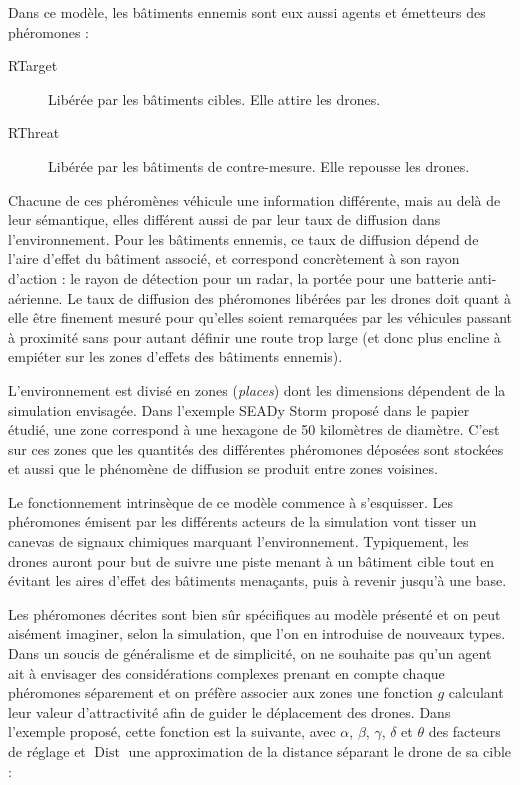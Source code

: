 \documentclass[12pt]{article}
\begin{document}
Dans ce modèle, les bâtiments ennemis sont eux aussi agents et
émetteurs des phéromones :

\begin{description}
\item[RTarget]{Libérée par les bâtiments cibles. Elle attire les
  drones.}
\item[RThreat]{Libérée par les bâtiments de contre-mesure. Elle
  repousse les drones.}
\end{description}

Chacune de ces phéromènes véhicule une information différente, mais au
delà de leur sémantique, elles différent aussi de par leur taux de
diffusion dans l'environnement.  Pour les bâtiments ennemis, ce taux
de diffusion dépend de l'aire d'effet du bâtiment associé, et
correspond concrètement à son rayon d'action : le rayon de détection
pour un radar, la portée pour une batterie anti-aérienne.  Le taux de
diffusion des phéromones libérées par les drones doit quant à elle
être finement mesuré pour qu'elles soient remarquées par les véhicules
passant à proximité sans pour autant définir une route trop large (et
donc plus encline à empiéter sur les zones d'effets des bâtiments
ennemis).

L'environnement est divisé en zones (\textit{places}) dont les
dimensions dépendent de la simulation envisagée.  Dans l'exemple SEADy
Storm proposé dans le papier étudié, une zone correspond à une
hexagone de 50 kilomètres de diamètre.  C'est sur ces zones que les
quantités des différentes phéromones déposées sont stockées et aussi
que le phénomène de diffusion se produit entre zones voisines.

Le fonctionnement intrinsèque de ce modèle commence à s'esquisser. Les
phéromones émisent par les différents acteurs de la simulation vont
tisser un canevas de signaux chimiques marquant l'environnement.
Typiquement, les drones auront pour but de suivre une piste menant à
un bâtiment cible tout en évitant les aires d'effet des bâtiments
menaçants, puis à revenir jusqu'à une base.

Les phéromones décrites sont bien sûr spécifiques au modèle présenté
et on peut aisément imaginer, selon la simulation, que l'on en
introduise de nouveaux types. Dans un soucis de généralisme et de
simplicité, on ne souhaite pas qu'un agent ait à envisager des
considérations complexes prenant en compte chaque phéromones
séparement et on préfère associer aux zones une fonction $g$ calculant
leur valeur d'attractivité afin de guider le déplacement des
drones. Dans l'exemple proposé, cette fonction est la suivante, avec
$\alpha$, $\beta$, $\gamma$, $\delta$ et $\theta$ des facteurs de
réglage et $\operatorname{Dist}$ une approximation de la distance
séparant le drone de sa cible :
\end{document}
